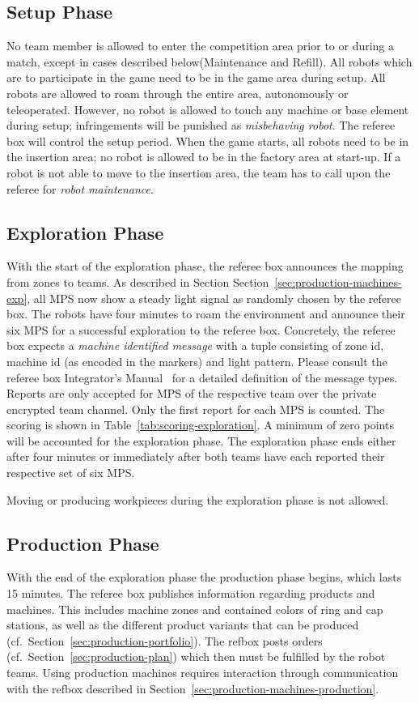 \documentclass[12pt,twoside]{article}
\newcommand{\refsec}[1]{Section~\ref{#1}}
\newcommand{\reftab}[1]{Table~\ref{#1}}
\begin{document}
\subsection{Setup Phase}
\label{sec:setup-phase}
No team member is allowed to enter the competition area prior to or
during a match, except in cases described below(Maintenance and
Refill).  All robots which are to participate in the game need to be
in the game area during setup. All robots are allowed to roam through
the entire area, autonomously or teleoperated. However, no robot is
allowed to touch any machine or base element during setup;
infringements will be punished as \textit{misbehaving robot}. The
referee box will control the setup period. When the game starts, all
robots need to be in the insertion area; no robot is allowed to be in
the factory area at start-up. If a robot is not able to move to the
insertion area, the team has to call upon the referee for
\textit{robot maintenance}.

\subsection{Exploration Phase}
\label{sec:exploration-phase}
With the start of the exploration phase, the referee box announces the
mapping from zones to teams. As described in Section
\refsec{sec:production-machines-exp}, all MPS now show a steady light
signal as randomly chosen by the referee box. The robots have four
minutes to roam the environment and announce their six MPS for a
successful exploration to the referee box. Concretely, the referee box
expects a \emph{machine identified message} with a tuple consisting of
zone id, machine id (as encoded in the markers) and light
pattern. Please consult the referee box Integrator's
Manual~\cite{RefBoxIntManual} for a detailed definition of the message
types. Reports are only accepted for MPS of the respective team over
the private encrypted team channel. Only the first report for each MPS
is counted. The scoring is shown in
\reftab{tab:scoring-exploration}. A minimum of zero points will be
accounted for the exploration phase. The exploration phase ends either
after four minutes or immediately after both teams have each reported
their respective set of six MPS.

Moving or producing workpieces during the exploration phase is not
allowed.

\subsection{Production Phase}
\label{sec:production-phase}
With the end of the exploration phase the production phase begins,
which lasts \num{15} minutes. The referee box publishes information
regarding products and machines. This includes machine zones and
contained colors of ring and cap stations, as well as the different
product variants that can be produced
(cf.~\refsec{sec:production-portfolio}). The refbox posts orders
(cf.~\refsec{sec:production-plan}) which then must be fulfilled by the
robot teams. Using production machines requires interaction through
communication with the refbox described in
\refsec{sec:production-machines-production}.
\end{document}
